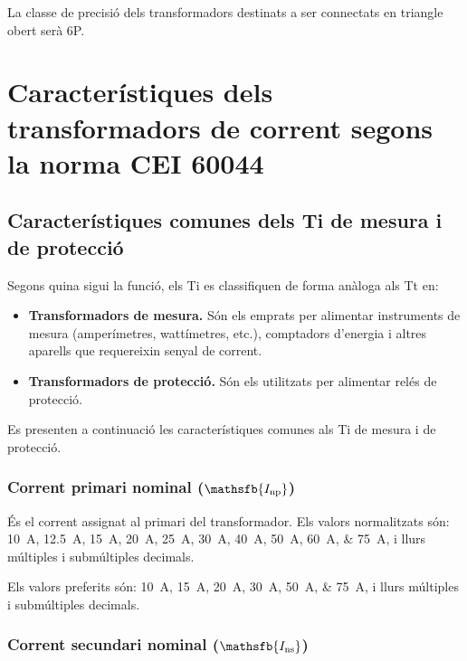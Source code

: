 La classe de precisió dels transformadors destinats a ser connectats en triangle obert serà 6P.

\section{Característiques dels transformadors de corrent segons la norma  CEI 60044}

\subsection{Característiques comunes dels Ti de mesura i de protecció}

Segons quina sigui la  funció, els Ti es classifiquen de forma
anàloga als Tt en:
\begin{itemize}
	\item \textbf{Transformadors de mesura.} Són els emprats per alimentar
	instruments de mesura (amperímetres, wattímetres, etc.),
	comptadors d'energia i altres aparells que requereixin senyal de corrent.
	\item \textbf{Transformadors de protecció.} Són els utilitzats per
	alimentar relés de protecció.
\end{itemize}			

Es presenten a continuació les característiques comunes als Ti de
mesura i de protecció.


\subsubsection{Corrent primari nominal ($\mathsfb{I_\text{np}}$)}

 És el corrent assignat al
primari del transformador. Els valors normalitzats
són: \qtylist{10; 12,5; 15; 20; 25;30; 40; 50; 60;75}{A}, i llurs múltiples i submúltiples decimals.

Els valors preferits són: \qtylist{10; 15; 20; 30; 50;75}{A}, i llurs múltiples i submúltiples decimals.


\subsubsection{Corrent secundari nominal ($\mathsfb{I_\text{ns}}$)}

